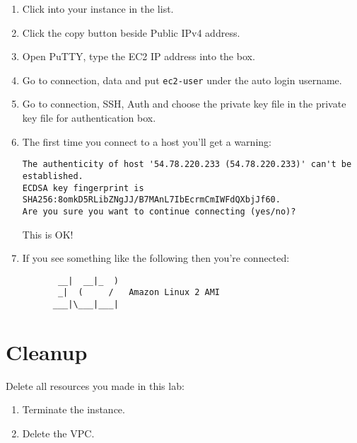 \begin{enumerate}
\item Click into your instance in the list.

\item Click the copy button beside Public IPv4 address.

\item Open PuTTY, type the EC2 IP address into the box.

\item Go to connection, data and put \texttt{ec2-user} under the auto login username.

\item Go to connection, SSH, Auth and choose the private key file in the private key file for authentication box. 

\item
The first time you connect to a host you'll get a warning:

\begin{verbatim}
The authenticity of host '54.78.220.233 (54.78.220.233)' can't be established.
ECDSA key fingerprint is SHA256:8omkD5RLibZNgJJ/B7MAnL7IbEcrmCmIWFdQXbjJf60.
Are you sure you want to continue connecting (yes/no)?
\end{verbatim}

This is OK!

\item 
If you see something like the following then you're connected:

\begin{verbatim}
       __|  __|_  )
       _|  (     /   Amazon Linux 2 AMI
      ___|\___|___|
\end{verbatim}

\end{enumerate}

\section{Cleanup}

Delete all resources you made in this lab:
\begin{enumerate}
\item Terminate the instance.
\item Delete the VPC.
\end{enumerate}

